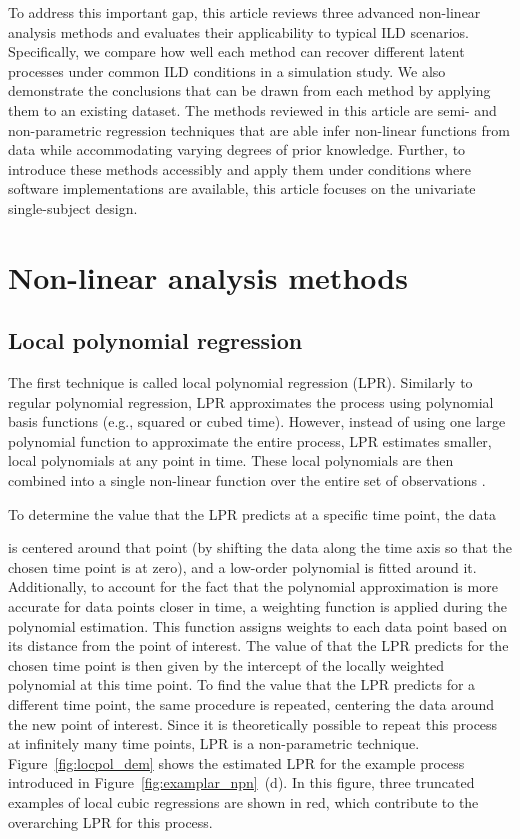 \documentclass[man, floatsintext]{apa7}
\begin{document}
To address this important gap, this article reviews three advanced non-linear
analysis methods and evaluates their applicability to typical ILD scenarios.
Specifically, we compare how well each method can recover different latent
processes under common ILD conditions in a simulation study. We also
demonstrate the conclusions that can be drawn from each method by applying them
to an existing dataset. The methods reviewed in this article are semi- and
non-parametric regression techniques that are able infer non-linear functions
from data while accommodating varying degrees of prior knowledge.
Further, to introduce these methods accessibly and apply them under
conditions where software implementations are available, this article
focuses on the univariate single-subject design.

\section{Non-linear analysis methods}

\subsection{Local polynomial regression}

The first technique is called local polynomial regression (LPR). Similarly to
regular polynomial regression, LPR approximates the process using polynomial
basis functions (e.g., squared or cubed time). However, instead of using one
large polynomial function to approximate the entire process, LPR estimates
smaller, local polynomials at any point in time. These local polynomials are
then combined into a single non-linear function over the entire set of
observations
\parencite{fan_adaptive_1995, ruppert_multivariate_1994, fan_local_2018}.

To determine the value that the LPR predicts at a specific time point, the data

is centered around that point (by shifting the data along the time axis so
that the chosen time point is at zero), and a low-order polynomial is fitted
around it. Additionally, to account for the fact that the polynomial
approximation is more accurate for data points closer in time, a weighting
function is applied during the polynomial estimation. This function assigns
weights to each data point
based on its distance from the point of interest. The value of that the
LPR predicts for the chosen time point is then given by the intercept of the
locally weighted polynomial at this time point. To find the value that the LPR
predicts for a different time point, the same procedure is repeated,
centering the data around the new point of interest. Since it is theoretically
possible to repeat this process at infinitely many
time points, LPR is a non-parametric technique. Figure~\ref{fig:locpol_dem}
shows the estimated LPR for the example process introduced in
Figure~\ref{fig:examplar_npn}~(d).  In this figure, three truncated examples of
local cubic regressions are shown
in red, which contribute to the overarching LPR for this process.\@
\end{document}
